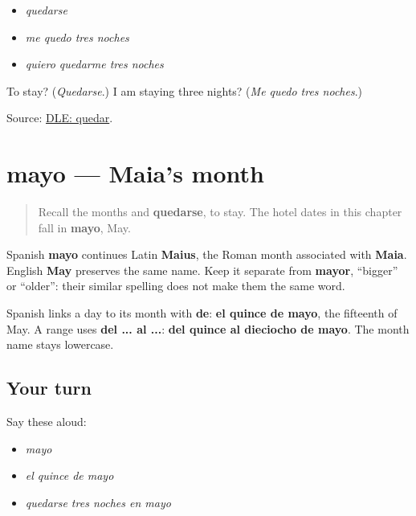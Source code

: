 \begin{itemize}
\raggedright
  \item \emph{quedarse}
  \item \emph{me quedo tres noches}
  \item \emph{quiero quedarme tres noches}
\end{itemize}

\begin{tcolorbox}[breakable,colback=teal!4,colframe=teal!35!black,title={Before you move on}]
To stay? (\emph{Quedarse}.) I am staying three nights? (\emph{Me quedo tres noches}.)

Source: \href{https://dle.rae.es/quedar}{DLE: quedar}.
\end{tcolorbox}
\section[mayo]{mayo — Maia's month}

\label{lesson:ES-C416-mayo}



\begin{quote}
Recall the months and \textbf{quedarse}, to stay. The hotel dates in this chapter fall in \textbf{mayo}, May.
\end{quote}

\begin{cousinweb}
Spanish \textbf{mayo} continues Latin \textbf{Maius}, the Roman month associated with \textbf{Maia}. English \textbf{May} preserves the same name. Keep it separate from \textbf{mayor}, “bigger” or “older”: their similar spelling does not make them the same word.
\end{cousinweb}

\begin{grammarlens}[title={Grammar Lens: dates use de}]
Spanish links a day to its month with \textbf{de}: \textbf{el quince de mayo}, the fifteenth of May. A range uses \textbf{del ... al ...}: \textbf{del quince al dieciocho de mayo}. The month name stays lowercase.
\end{grammarlens}

\subsection*{Your turn}
Say these aloud:

\begin{itemize}
\raggedright
  \item \emph{mayo}
  \item \emph{el quince de mayo}
  \item \emph{quedarse tres noches en mayo}
\end{itemize}


